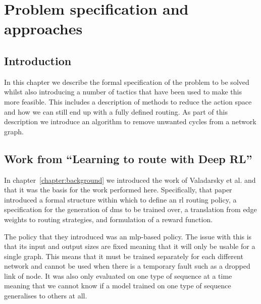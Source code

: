 \chapter{Problem specification and approaches}
\label{chapter:problem}

\section{Introduction}
In this chapter we describe the formal specification of the problem to be solved whilst also introducing a number of tactics that have been used to make this more feasible. This includes a description of methods to reduce the action space and how we can still end up with a fully defined routing. As part of this description we introduce an algorithm to remove unwanted cycles from a network graph.

\section{Work from ``Learning to route with Deep RL''}
In chapter~\ref{chapter:background} we introduced the work of Valadarsky et al.\cite{valadarsky2017learning} and that it was the basis for the work performed here. Specifically, that paper introduced a formal structure within which to define an \ac{rl} routing policy, a specification for the generation of \acp{dm} to be trained over, a translation from edge weights to routing strategies, and formulation of a reward function.

The policy that they introduced was an \ac{mlp}-based policy. The issue with this is that its input and output sizes are fixed meaning that it will only be usable for a single graph. This means that it must be trained separately for each different network and cannot be used when there is a temporary fault such as a dropped link of node. It was also only evaluated on one type of sequence at a time meaning that we cannot know if a model trained on one type of sequence generalises to others at all.


